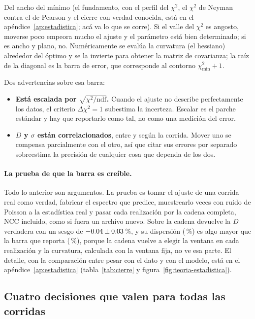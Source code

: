 \documentclass[11pt,a4paper]{article}
\begin{document}
Del ancho del mínimo (el fundamento, con el perfil del $\chi^2$, el
$\chi^2$ de Neyman contra el de Pearson y el cierre con verdad conocida, está
en el apéndice~\ref{ap:estadistica}; acá va lo que se corre). Si el valle del $\chi^2$ es angosto, moverse poco empeora
mucho el ajuste y el parámetro está bien determinado; si es ancho y plano, no.
Numéricamente se evalúa la curvatura (el hessiano) alrededor del óptimo y se la
invierte para obtener la matriz de covarianza; la raíz de la diagonal es la
barra de error, que corresponde al contorno $\chi^2_{\min} + 1$.

Dos advertencias sobre esa barra:

\begin{itemize}
\item \textbf{Está escalada por $\sqrt{\chi^2/\text{ndf}}$.} Cuando el ajuste
      no describe perfectamente los datos, el criterio $\Delta\chi^2 = 1$
      subestima la incerteza. Escalar es el parche estándar y hay que
      reportarlo como tal, no como una medición del error.
\item \textbf{$D$ y $\sigma$ están correlacionados}, entre \CorrMin{} y
      \CorrMax{} según la corrida. Mover uno se compensa parcialmente con el
      otro, así que citar sus errores por separado sobreestima la precisión de
      cualquier cosa que dependa de los dos.
\end{itemize}

\paragraph{La prueba de que la barra es creíble.} Todo lo anterior son
argumentos. La prueba es tomar el ajuste de una corrida real como verdad,
fabricar el espectro que predice, muestrearlo \CierreN{} veces con ruido de
Poisson a la estadística real y pasar cada realización por la cadena
completa, NCC incluido, como si fuera un archivo nuevo. Sobre \EjCorrida{} la
cadena devuelve la $D$ verdadera con un sesgo de
$-0.04 \pm 0.03$\,\%, y su dispersión
(\CierreDispNeyman\,\%) es algo mayor que la barra que reporta
(\CierreErrRepNeyman\,\%), porque la cadena vuelve a elegir la ventana en
cada realización y la curvatura, calculada con la ventana fija, no ve esa
parte. El detalle, con la comparación entre pesar con el dato y con el
modelo, está en el apéndice~\ref{ap:estadistica}
(tabla~\ref{tab:cierre} y figura~\ref{fig:teoria-estadistica}).

\subsection{Cuatro decisiones que valen para todas las corridas}
\label{sec:decisiones}
\propio
\end{document}
